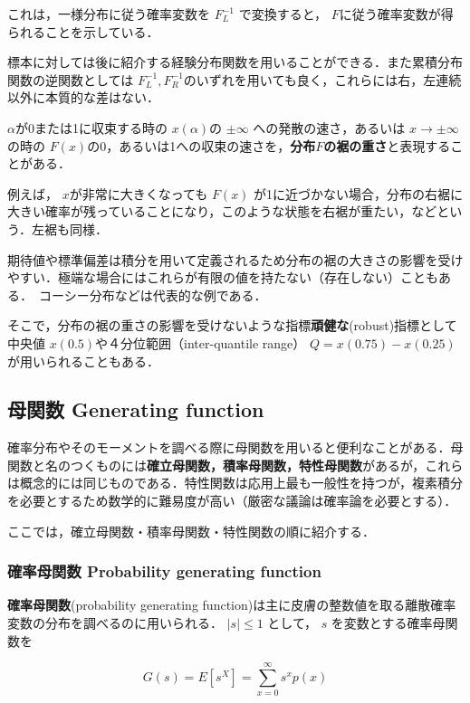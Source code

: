 \documentclass[12pt,a4j,draft]{jarticle}
\numberwithin{equation}{section}
\theoremstyle{break}
\newcommand{\inv}[1]{#1^{-1}}
\begin{document}
これは，一様分布に従う確率変数を $\inv{F_L}$ で変換すると， $F$に従う確率変数が得られることを示している．

標本に対しては後に紹介する経験分布関数を用いることができる．また累積分布関数の逆関数としては $\inv{F_L}, \inv{F_R}$のいずれを用いても良く，これらには右，左連続以外に本質的な差はない．

$\alpha$が0または1に収束する時の $x(\alpha)$の $\pm \infty$ への発散の速さ，あるいは $x \rightarrow \pm \infty$の時の $F(x)$の0，あるいは1への収束の速さを，\textbf{分布$F$の裾の重さ}と表現することがある．

例えば， $x$が非常に大きくなっても $F(x)$ が1に近づかない場合，分布の右裾に大きい確率が残っていることになり，このような状態を右裾が重たい，などという．左裾も同様．

期待値や標準偏差は積分を用いて定義されるため分布の裾の大きさの影響を受けやすい．極端な場合にはこれらが有限の値を持たない（存在しない）こともある．　コーシー分布などは代表的な例である．

そこで，分布の裾の重さの影響を受けないような指標\textbf{頑健な}(robust)指標として中央値 $x(0.5)$や４分位範囲（inter-quantile range） $Q = x(0.75) - x(0.25)$ が用いられることもある．

\subsection{母関数 Generating function} 

確率分布やそのモーメントを調べる際に母関数を用いると便利なことがある．母関数と名のつくものには\textbf{確立母関数，積率母関数，特性母関数}があるが，これらは概念的には同じものである．特性関数は応用上最も一般性を持つが，複素積分を必要とするため数学的に難易度が高い（厳密な議論は確率論を必要とする）．

ここでは，確立母関数・積率母関数・特性関数の順に紹介する．

\subsubsection{確率母関数 Probability generating function}

\textbf{確率母関数}(probability generating function)は主に皮膚の整数値を取る離散確率変数の分布を調べるのに用いられる． $|s| \leq 1$ として， $s$ を変数とする確率母関数を 

\begin{equation}
    \label{eq:def-pgf}
    G(s) = E[s^X] = \sum_{x=0}^{\infty} s^x p(x)
\end{equation}
\end{document}

